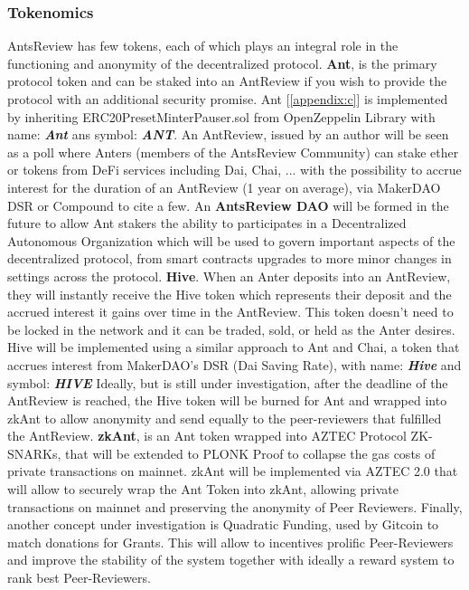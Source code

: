 \documentclass[runningheads]{llncs}
\begin{document}
\subsubsection{Tokenomics}

AntsReview has few tokens, each of which plays an integral role in the functioning and anonymity of the decentralized protocol.
\newline \textbf{Ant}, is the primary protocol token and can be staked into an AntReview if you wish to provide the protocol with an additional security promise.
\newline Ant [\ref{appendix:c}] is implemented by inheriting ERC20PresetMinterPauser.sol from OpenZeppelin Library with name: \textbf{\emph{Ant}} ans symbol: \textbf{\emph{ANT}}.
\newline An AntReview, issued by an author will be seen as a poll where Anters (members of the AntsReview Community) can stake ether or tokens from DeFi services including Dai, Chai, ... with the possibility to accrue interest for the duration of an AntReview (1 year on average), via MakerDAO DSR or Compound to cite a few.
\newline An \textbf{AntsReview DAO} will be formed in the future to allow Ant stakers the ability to participates in a Decentralized Autonomous Organization which will be used to govern important aspects of the decentralized protocol, from smart contracts upgrades to more minor changes in settings across the protocol.
\newline \textbf{Hive}. When an Anter deposits into an AntReview, they will instantly receive the Hive token which represents their deposit and the accrued interest it gains over time in the AntReview.
\newline This token doesn't need to be locked in the network and it can be traded, sold, or held as the Anter desires.
\newline Hive will be implemented using a similar approach to Ant and Chai, a token that accrues interest from MakerDAO's DSR (Dai Saving Rate), with name: \textbf{\emph{Hive}} and symbol: \textbf{\emph{HIVE}}
\newline Ideally, but is still under investigation, after the deadline of the AntReview is reached, the Hive token will be burned for Ant and wrapped into zkAnt to allow anonymity and send equally to the peer-reviewers that fulfilled the AntReview.
\newline \textbf{zkAnt}, is an Ant token wrapped into AZTEC Protocol ZK-SNARKs, that will be extended to PLONK Proof to collapse the gas costs of private transactions on mainnet.
\newline zkAnt will be implemented via AZTEC 2.0 that will allow to securely wrap the Ant Token into zkAnt, allowing private transactions on mainnet and preserving the anonymity of Peer Reviewers.
\newline Finally, another concept under investigation is Quadratic Funding, used by Gitcoin to match donations for Grants. This will allow to incentives prolific Peer-Reviewers and improve the stability of the system together with ideally a reward system to rank best Peer-Reviewers.
\end{document}
